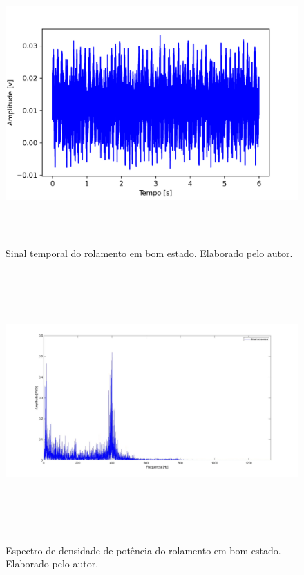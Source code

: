 \documentclass[
	12pt,				
	oneside,			
	a4paper,			
	english,			
	brazil,			
	]{abntex2ppgsi}
\begin{document}
{{{{{{{{{{{{{\begin{figure}[H]
\centering
\caption {Sinal temporal do rolamento em bom estado. Elaborado pelo autor.}
\includegraphics[width=\textwidth,height=100mm,keepaspectratio]{Caso1/DOMINIO_TEMPO_ROLAMENTO_BOM}
\label{DOMINIO_TEMPO_ROLAMENTO_BOM}
\end{figure} 


\begin{figure}[H]
\centering
\caption {Espectro de densidade de potência do rolamento em bom estado. Elaborado pelo autor.}
\includegraphics[width=\textwidth,height=100mm,keepaspectratio]{GraficosAnalise/PSD_ROLAMENTO_BOM}
\label{PSD_ROLAMENTO_BOM}
\end{figure} 

}}}}}}}}}}}}}
\end{document}
